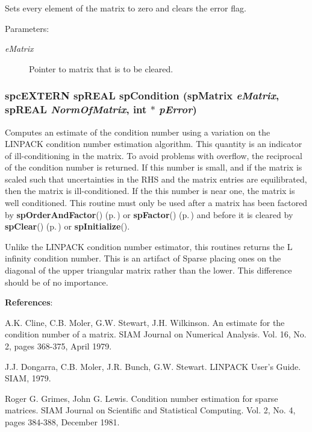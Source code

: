 Sets every element of the matrix to zero and clears the error flag.\begin{Desc}
\item[Parameters: ]\par
\begin{description}
\item[{\em 
e\-Matrix}]Pointer to matrix that is to be cleared. \end{description}
\end{Desc}
\subsubsection{\setlength{\rightskip}{0pt plus 5cm}spc\-EXTERN sp\-REAL sp\-Condition ({\bf sp\-Matrix} {\em e\-Matrix}, sp\-REAL {\em Norm\-Of\-Matrix}, int $\ast$ {\em p\-Error})}\label{spMatrix_8h_a23}


Computes an estimate of the condition number using a variation on the LINPACK condition number estimation algorithm. This quantity is an indicator of ill-conditioning in the matrix. To avoid problems with overflow, the reciprocal of the condition number is returned. If this number is small, and if the matrix is scaled such that uncertainties in the RHS and the matrix entries are equilibrated, then the matrix is ill-conditioned. If the this number is near one, the matrix is well conditioned. This routine must only be used after a matrix has been factored by {\bf sp\-Order\-And\-Factor}() {\rm (p.\,\pageref{spMatrix_8h_a46})} or {\bf sp\-Factor}() {\rm (p.\,\pageref{spMatrix_8h_a30})} and before it is cleared by {\bf sp\-Clear}() {\rm (p.\,\pageref{spMatrix_8h_a22})} or {\bf sp\-Initialize}().

Unlike the LINPACK condition number estimator, this routines returns the L infinity condition number. This is an artifact of Sparse placing ones on the diagonal of the upper triangular matrix rather than the lower. This difference should be of no importance.

{\bf References}:

A.K. Cline, C.B. Moler, G.W. Stewart, J.H. Wilkinson. An estimate for the condition number of a matrix. SIAM Journal on Numerical Analysis. Vol. 16, No. 2, pages 368-375, April 1979.

J.J. Dongarra, C.B. Moler, J.R. Bunch, G.W. Stewart. LINPACK User's Guide. SIAM, 1979.

Roger G. Grimes, John G. Lewis. Condition number estimation for sparse matrices. SIAM Journal on Scientific and Statistical Computing. Vol. 2, No. 4, pages 384-388, December 1981.


